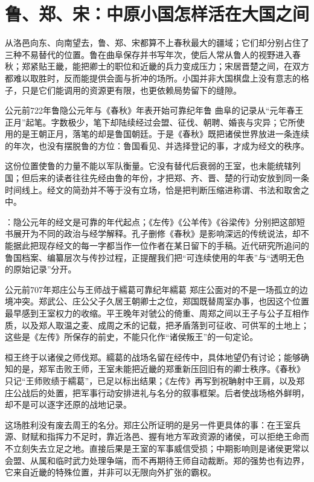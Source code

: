 \section{鲁、郑、宋：中原小国怎样活在大国之间}

从洛邑向东、向南望去，鲁、郑、宋都算不上春秋最大的疆域；它们却分别占住了三种不易替代的位置。鲁在曲阜保存并书写年次，使后人常从鲁人的视野进入春秋；郑紧贴王畿，能把卿士的职位和近畿的兵力变成压力；宋居晋楚之间，在双方都难以取胜时，反而能提供会面与折冲的场所。小国并非大国棋盘上没有意志的格子，只是它们能调用的资源更有限，也更依赖局势留下的缝隙。

\begin{event}{公元前722年}{鲁隐公元年与《春秋》年表开始}{可靠纪年}{鲁}
曲阜的记录从“元年春王正月”起笔。字数极少，笔下却陆续经过会盟、征伐、朝聘、婚丧与灾异；它所使用的是王朝正月，落笔的却是鲁国朝廷。于是《春秋》既把诸侯世界放进一条连续的年次，也没有摆脱鲁的方位：鲁国看见、并选择登记的事，才成为经文的秩序。

这份位置使鲁的力量不能以军队衡量。它没有替代后衰弱的王室，也未能统辖列国；但后来的读者往往先经由鲁的年份，才把郑、齐、晋、楚的行动安放到同一条时间线上。经文的简劲并不等于没有立场，恰是把判断压缩进称谓、书法和取舍之中。

：隐公元年的经文是可靠的年代起点；《左传》《公羊传》《谷梁传》分别把这部短书展开为不同的政治与经学解释。孔子删修《春秋》是影响深远的传统说法，却不能据此把现存经文的每一字都当作一位作者在某日留下的手稿。近代研究所追问的鲁国档案、编纂层次与传抄过程，正提醒我们把“可连续使用的年表”与“透明无色的原始记录”分开。
\end{event}

\begin{event}{公元前707年}{郑庄公与王师战于繻葛}{可靠纪年}{繻葛}
郑庄公面对的不是一场孤立的边境冲突。郑武公、庄公父子久居王朝卿士之位，郑国既替周室办事，也因这个位置最早感到王室权力的收缩。平王晚年对虢公的倚重、周郑之间以王子与公子互相作质，以及郑人取温之麦、成周之禾的记载，把矛盾落到可征收、可供军的土地上；这些是《左传》所保存的前史，不能只化作“诸侯叛王”的一句定论。

桓王终于以诸侯之师伐郑。繻葛的战场名留在经传中，具体地望仍有讨论；能够确知的是，郑军击败王师，王室未能把近畿的郑重新压回旧有的卿士秩序。《春秋》只记“王师败绩于繻葛”，已足以标出结果；《左传》再写到祝聃射中王肩，以及郑庄公战后的处置，把军事行动安排进礼与名分的叙事框架。后者使战场格外鲜明，却不是可以逐字还原的战地记录。

这场胜利没有废去周王的名分。郑庄公所证明的是另一件更具体的事：在王室兵源、财赋和指挥力不足时，靠近洛邑、握有地方军政资源的诸侯，可以拒绝王命而不立刻失去立足之地。直接后果是王室的军事威信受损；中期影响则是诸侯更常以会盟、从属和临时武力处理争端，而不再期待王师自动裁断。郑的强势也有边界，它来自近畿的特殊位置，并非可以无限向外扩张的霸权。
\end{event}

